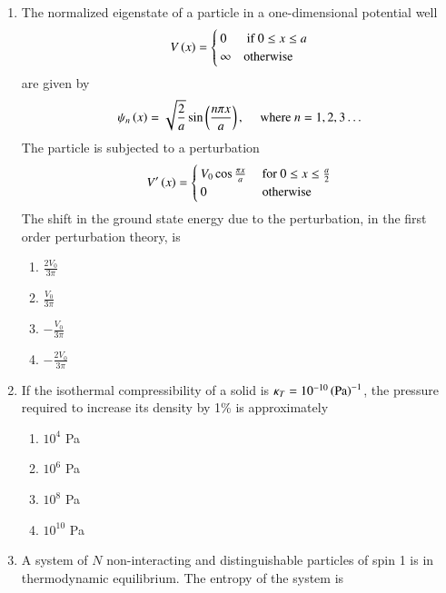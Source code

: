 \documentclass[journal]{IEEEtran}
\begin{document}
\begin{enumerate}
\begin{multicols}{4}
\begin{enumerate}
    \end{enumerate}
\end{multicols}
\item The normalized eigenstate of a particle in a one-dimensional potential well
\begin{align*}
    V\left(x\right)=
    \begin{cases}
    0 & \text{ if } 0 \le x \le a \\ \infty & \text{otherwise}
    \end{cases}
\end{align*}
are given by
\begin{align*}
    \psi_n\left(x\right)=\sqrt{\frac{2}{a}}\sin\left(\frac{n\pi x}{a}\right) , \quad \text{ where } n=1,2,3\dots
\end{align*}
The particle is subjected to a perturbation
\begin{align*}
V^\prime \left(x\right)=
    \begin{cases}
    V_0\cos{\frac{\pi x}{a}} & \text{  for }0 \le x \le \frac{a}{2}
    \\ 0 & \text{\space otherwise}
    \end{cases}
\end{align*}
The shift in the ground state energy due to the perturbation, in the first order perturbation theory, is
\begin{multicols}{4}
    \begin{enumerate}
        \item $\frac{2V_0}{3\pi}$
        \item $\frac{V_0}{3\pi}$
        \item $-\frac{V_0}{3\pi}$
        \item $-\frac{2V_0}{3\pi}$
    \end{enumerate}
\end{multicols}
\item If the isothermal compressibility of a solid is $\kappa_T = 10^{-10} \left(\text{Pa}\right)^{-1}$, the pressure required to increase its density by 1\% is approximately
\begin{multicols}{4}
    \begin{enumerate}
        \item $10^4$ Pa
        \item $10^6$ Pa
        \item $10^8$ Pa
        \item $10^{10}$ Pa
    \end{enumerate}
\end{multicols}
\item A system of $N$ non-interacting and distinguishable particles of spin 1 is in thermodynamic equilibrium. The entropy of the system is

\end{enumerate}
\end{document}
